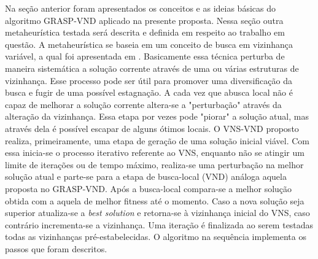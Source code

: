 \documentclass[12pt]{article}
\begin{document}
Na seção anterior foram apresentados os conceitos e as ideias básicas do algoritmo GRASP-VND aplicado na presente proposta. Nessa seção outra metaheurística testada será descrita e definida em respeito ao trabalho em questão. A metaheurística se baseia em um conceito de busca em vizinhança variável, a qual foi apresentada em \cite{VND97}. Basicamente essa técnica perturba de maneira sistemática a solução corrente através de uma ou várias estruturas de vizinhança. Esse processo pode ser útil para promover uma diversificação da busca e fugir de uma possível estagnação. A cada vez que abusca local não é capaz de melhorar a solução corrente altera-se a "perturbação" através da alteração da vizinhança. Essa etapa por vezes pode "piorar" a solução atual, mas através dela é possível escapar de alguns ótimos locais. O VNS-VND proposto realiza, primeiramente, uma etapa de geração de uma solução inicial viável. Com essa inicia-se o processo iterativo referente ao VNS, enquanto não se atingir um limite de iterações ou de tempo máximo, realiza-se uma perturbação na melhor solução atual e parte-se para a etapa de busca-local (VND) análoga aquela proposta no GRASP-VND. Após a busca-local compara-se a melhor solução obtida com a aquela de melhor fitness até o momento. Caso a nova solução seja superior atualiza-se a \textit{best solution} e retorna-se à vizinhança inicial do VNS, caso contrário incrementa-se a vizinhança. Uma iteração é finalizada ao serem testadas todas as vizinhanças pré-estabelecidas. O algoritmo na sequência implementa os passos que foram descritos.
\end{document}
